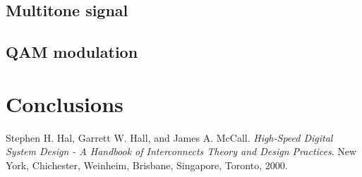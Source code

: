 \documentclass[en,printmode]{mgr}
\begin{document}
	\section{Multitone signal}
	\section{QAM modulation}


\chapter{ Conclusions}



\begin{thebibliography}{9}
Stephen H. Hal, Garrett W. Hall, and James A. McCall. 
\textit{High-Speed Digital System Design - A Handbook of Interconnects Theory and Design Practices}.
New York, Chichester, Weinheim, Brisbane, Singapore, Toronto, 2000.


\end{thebibliography}
\end{document}

